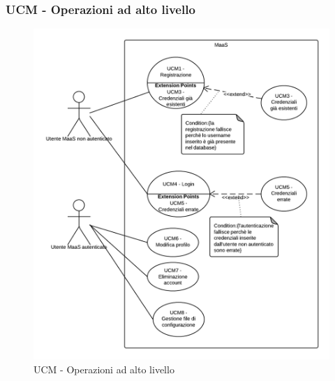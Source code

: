\subsubsection{UCM - Operazioni ad alto livello} 
    \begin{figure}[H]
      \begin{center}
      \includegraphics[scale=0.16]{UML/UCM - Operazioni ad alto livello.png}
      \caption{UCM - Operazioni ad alto livello}
      \end{center} 
    \end{figure}  
    
